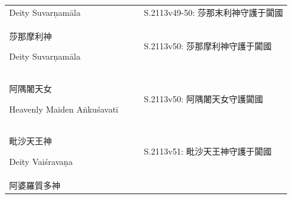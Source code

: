 \documentclass[
  english,
  a4paper,
  DIV=12,
  footlines=2.1,
  usegeometry=true]{scrartcl}
\begin{document}
\begin{longtable}[]{@{}llll@{}}
\begin{minipage}[t]{0.18\columnwidth}
Deity Suvarṇamāla\strut
\end{minipage} & \begin{minipage}[t]{0.13\columnwidth}\raggedright
\strut
\end{minipage} & \begin{minipage}[t]{0.13\columnwidth}\raggedright
\strut
\end{minipage} & \begin{minipage}[t]{0.44\columnwidth}\raggedright
S.2113v49-50: 莎那末利神守護于闐國\strut
\end{minipage}\tabularnewline
\begin{minipage}[t]{0.18\columnwidth}\raggedright
莎那摩利神

Deity Suvarṇamāla\strut
\end{minipage} & \begin{minipage}[t]{0.13\columnwidth}\raggedright
\strut
\end{minipage} & \begin{minipage}[t]{0.13\columnwidth}\raggedright
\strut
\end{minipage} & \begin{minipage}[t]{0.44\columnwidth}\raggedright
S.2113v50: 莎那摩利神守護于闐國\strut
\end{minipage}\tabularnewline
\begin{minipage}[t]{0.18\columnwidth}\raggedright
阿隅闍天女

Heavenly Maiden Aṅkuśavatī\strut
\end{minipage} & \begin{minipage}[t]{0.13\columnwidth}\raggedright
\strut
\end{minipage} & \begin{minipage}[t]{0.13\columnwidth}\raggedright
\strut
\end{minipage} & \begin{minipage}[t]{0.44\columnwidth}\raggedright
S.2113v50: 阿隅闍天女守護闐國\strut
\end{minipage}\tabularnewline
\begin{minipage}[t]{0.18\columnwidth}\raggedright
毗沙天王神

Deity Vaiśravaṇa\strut
\end{minipage} & \begin{minipage}[t]{0.13\columnwidth}\raggedright
\strut
\end{minipage} & \begin{minipage}[t]{0.13\columnwidth}\raggedright
\strut
\end{minipage} & \begin{minipage}[t]{0.44\columnwidth}\raggedright
S.2113v51: 毗沙天王神守護于闐國\strut
\end{minipage}\tabularnewline
\begin{minipage}[t]{0.18\columnwidth}\raggedright
阿婆羅質多神


\end{minipage}
\end{longtable}
\end{document}
